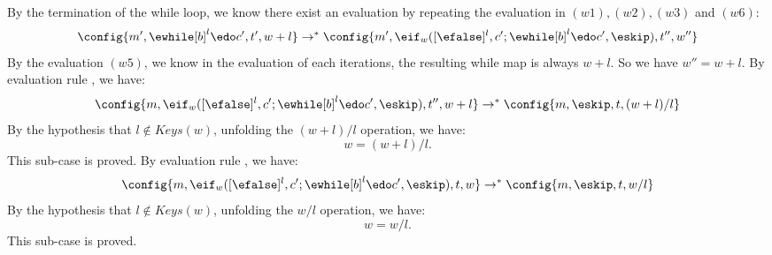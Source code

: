{\begin{subproof}
\[\]
%
By the termination of the while loop, we know there exist an evaluation by repeating the evaluation in $(w1), (w2), (w3)$ and $(w6)$:
%
\[
	\config{m', \ewhile [b]^l \edo c', t', w + l} \to^{*} \config{m', \eif_w([\efalse]^l, c';\ewhile [b]^l \edo c', \eskip), t'', w''}
\]
%
By the evaluation $(w5)$, we know in the evaluation of each iterations, the resulting while map is always $w + l$. So we have $w'' = w + l$.
%
By evaluation rule , we have:
%
\[
	\config{m, \eif_w([\efalse]^l, c';\ewhile [b]^l \edo c', \eskip), t'', w + l} 
	\to^{*} \config{m, \eskip, t, (w + l)/l}
\]
%
By the hypothesis that $l \notin Keys(w)$, unfolding the $(w + l)/l$ operation, we have:
%
\[
	w = (w + l)/l.
\]
%
This sub-case is proved.
%
%
By evaluation rule , we have:
%
\[
	\config{m, \eif_w([\efalse]^l, c';\ewhile [b]^l \edo c', \eskip), t, w} 
	\to^{*} \config{m, \eskip, t, w/l}
\]
%
By the hypothesis that $l \notin Keys(w)$, unfolding the $w/l$ operation, we have:
%
\[
	w = w/l.
\]
%
This sub-case is proved.
%
\end{subproof}
}


